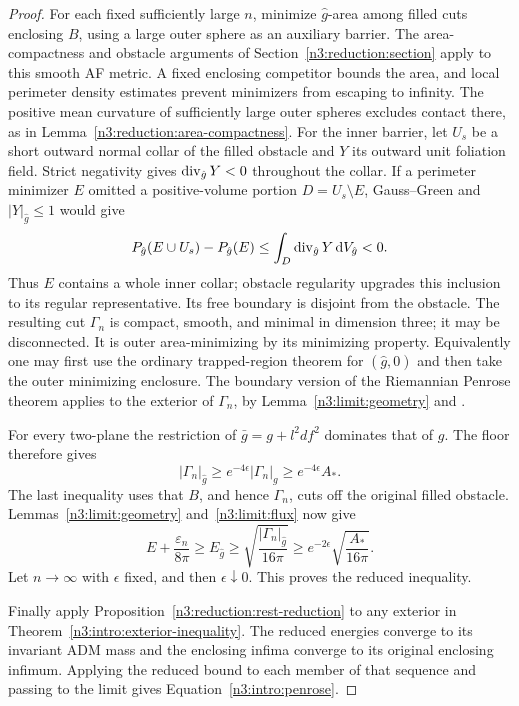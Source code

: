 \begin{proof}
For each fixed sufficiently large \(n\), minimize \(\hat g\)-area
among filled cuts enclosing \(B\), using a large outer sphere as an
auxiliary barrier. The area-compactness and obstacle arguments of
Section~\ref{n3:reduction:section} apply to this smooth AF metric.
A fixed enclosing competitor bounds the area, and local perimeter
density estimates prevent minimizers from escaping to infinity.
The positive mean curvature of sufficiently large outer spheres
excludes contact there, as in Lemma~\ref{n3:reduction:area-compactness}.
For the inner barrier, let \(U_s\) be a short outward normal collar
of the filled obstacle and \(Y\) its outward unit foliation field.
Strict negativity gives \(\operatorname{div}_{\hat g}Y<0\) throughout the collar.
If a perimeter minimizer \(E\) omitted a positive-volume portion
\(D=U_s\setminus E\), Gauss--Green and \(|Y|_{\hat g}\le1\) would give
\[
 P_{\hat g}(E\cup U_s)-P_{\hat g}(E)
       \le\int_D\operatorname{div}_{\hat g}Y\,\mathrm d V_{\hat g}<0.
\]
Thus \(E\) contains a whole inner collar; obstacle regularity upgrades
this inclusion to its regular representative. Its free boundary is
disjoint from the obstacle. The resulting cut \(\Gamma_n\) is compact,
smooth, and minimal in dimension three; it may be disconnected.
It is outer area-minimizing by its minimizing property.
Equivalently one may first use the ordinary trapped-region theorem
for \((\hat g,0)\) and then take the outer minimizing enclosure.
The boundary version of the Riemannian Penrose theorem applies to the
exterior of \(\Gamma_n\), by Lemma~\ref{n3:limit:geometry}
and \cite[Theorem~19]{Bray2001}.

For every two-plane the restriction of \(\bar g=g+l^2df^2\) dominates
that of \(g\). The floor therefore gives
\[
                  |\Gamma_n|_{\hat g}
          \ge e^{-4\epsilon}|\Gamma_n|_g
          \ge e^{-4\epsilon}A_*.
\]
The last inequality uses that \(B\), and hence \(\Gamma_n\), cuts off
the original filled obstacle. Lemmas~\ref{n3:limit:geometry}
and~\ref{n3:limit:flux} now give
\[
 E+\frac{\varepsilon_n}{8\pi}
       \ge E_{\hat g}
       \ge\sqrt{\frac{|\Gamma_n|_{\hat g}}{16\pi}}
       \ge e^{-2\epsilon}\sqrt{\frac{A_*}{16\pi}}.
\]
Let \(n\to\infty\) with \(\epsilon\) fixed, and then
\(\epsilon\downarrow0\). This proves the reduced inequality.

Finally apply Proposition~\ref{n3:reduction:rest-reduction} to any
exterior in Theorem~\ref{n3:intro:exterior-inequality}.
The reduced energies converge to its invariant ADM mass and the
enclosing infima converge to its original enclosing infimum.
Applying the reduced bound to each member of that sequence and passing
to the limit gives Equation~\eqref{n3:intro:penrose}.
\end{proof}
